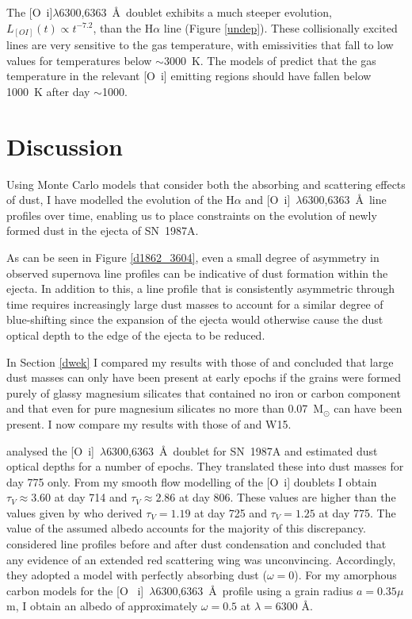 The [O~{\sc i}]$\lambda$6300,6363~\AA\ doublet exhibits a much 
steeper evolution, $L_{[OI]}(t) \propto t^{-7.2}$, than the H$\alpha$ line 
(Figure \ref{undep}). These collisionally excited lines are very sensitive 
to the gas temperature, with emissivities that fall to low values for 
temperatures below $\sim$3000~K. The models of \citet{Li1992,Kozma1998a} 
predict that the gas temperature in the relevant [O~{\sc i}] emitting 
regions should have fallen below 1000~K after day $\sim$1000.





\section{Discussion}
\label{discuss}

Using Monte Carlo models that consider both the absorbing and scattering 
effects of dust, I have modelled the evolution of the H$\alpha$ and 
[O~{\sc i}]~$\lambda$6300,6363~\AA\ line profiles over time, enabling us 
to place constraints on the evolution of newly formed dust in the ejecta 
of SN~1987A.

As can be seen in Figure \ref{d1862_3604}, even a small degree of 
asymmetry in observed supernova line profiles can be indicative of dust 
formation within the ejecta.  In addition to this, a line profile that is 
consistently asymmetric through time requires increasingly large dust 
masses to account for a similar degree of blue-shifting since the 
expansion of the ejecta would otherwise cause the dust optical depth to 
the edge of the ejecta to be reduced.

In Section \ref{dwek} I compared my results with those of \citet{Dwek2015} and 
concluded that large dust masses can only have been present at early 
epochs if the grains were formed purely of glassy magnesium silicates that 
contained no iron or carbon component and that even for pure magnesium 
silicates no more than 0.07~M$_\odot$ can have been present. I now 
compare my results with those of \citet{Lucy1989} and W15.

\citet{Lucy1989} analysed the [O~{\sc i}]~$\lambda$6300,6363~\AA\ doublet 
for SN~1987A and estimated dust optical depths for a number of epochs. 
They translated these into dust masses for day 775 only. From my smooth 
flow modelling of the [O~{\sc i}] doublets I obtain $\tau_V \approx 3.60$ at day 
714 and $\tau_V \approx 2.86$ at day 806.  These values are higher 
than the values given by \citet{Lucy1989} who derived $\tau_V=1.19$ at day 
725 and $\tau_V=1.25$ at day 775.  The value of the assumed albedo 
accounts for the majority of this discrepancy.  \citet{Lucy1989} 
considered line profiles before and after dust condensation and concluded 
that any evidence of an extended red scattering wing was unconvincing.  
Accordingly, they adopted a model with perfectly absorbing dust ($\omega = 
0$).  For my amorphous carbon models for the [O~{\sc 
i}]~$\lambda$6300,6363~\AA\ profile using a grain radius $a=0.35\mu$m, I 
obtain an albedo of approximately $\omega = 0.5$ at $\lambda=6300$ \AA.


